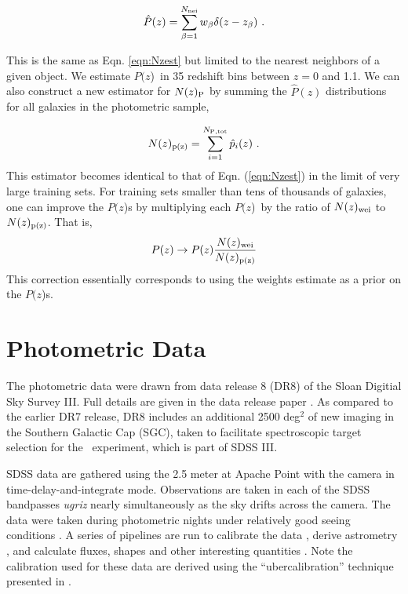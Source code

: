 \documentclass[preprint]{aastex}
\newcommand{\pofz}{$P(z$)}
\newcommand{\nwei}{N(z)_{\rm wei}}
\newcommand{\npz}{N(z)_{\rm p(z)}}
\begin{document}
\begin{equation}
\hat{P}(z) = \sum_{\beta=1}^{N_{\rm nei}} w_\beta \delta(z-z_\beta)~.
\label{eqn:pzest}
\end{equation}

\noindent This is the same as Eqn. \ref{eqn:Nzest} but limited to the nearest
neighbors of a given object. We estimate \pofz\ in 35 redshift bins between
$z=0$ and 1.1.  We can also construct a new estimator for $N(z)_{\rm P}$ by
summing the $\hat{P}(z)$ distributions for all galaxies in the photometric
sample,


\begin{equation}
\npz = \sum_{i=1}^{N_{\rm P,tot}}\hat{p}_i(z)~.
\label{eqn:Nhat2}
\end{equation}
\noindent This estimator becomes identical to that of Eqn. (\ref{eqn:Nzest})
in the limit of very large training sets.  For training sets smaller than tens
of thousands of galaxies, one can improve the \pofz s by multiplying each \pofz\ by the
ratio of $\nwei$ to $\npz$.
That is,
\begin{equation} \label{eq:pzcorrect}
P(z) \rightarrow P(z)\frac{\nwei}{\npz} \label{eqn:pzcorrect}
\end{equation}
This correction essentially corresponds to using the weights estimate as a
prior on the \pofz s.



\section{Photometric Data} \label{sec:data}

The photometric data were drawn from data release 8 (DR8) of the Sloan Digitial
Sky Survey III.  Full details are given in the data release paper \citet{dr8}.
As compared to the earlier DR7 release, DR8 includes an additional 2500
deg$^2$ of new imaging in the Southern Galactic Cap (SGC), %
taken to facilitate spectroscopic target selection for the \boss\ experiment,
which is part of SDSS III.


SDSS data are gathered using the 2.5 meter at Apache Point \citep{Gunn06} with
the camera \citep{Gunn98} in time-delay-and-integrate mode.  Observations are
taken in each of the SDSS bandpasses {\it ugriz} nearly simultaneously as the
sky drifts across the camera.  The data were taken during photometric nights
under relatively good seeing conditions \citep{Hogg01}.  A series of pipelines
are run to calibrate the data \citep{Nikhil08,Smith02,Tucker06}, derive
astrometry \citep{Pier03}, and calculate fluxes, shapes and other interesting
quantities \citep{LuptonADASS01}.  Note the calibration used for these data are
derived using the ``ubercalibration'' technique presented in \citet{Nikhil08}.
\end{document}
